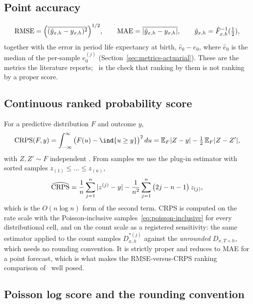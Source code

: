 \subsection{Point accuracy}

\begin{equation}
  \operatorname{RMSE} = \Big(\overline{(\hat y_{x,h}-y_{x,h})^2}\Big)^{1/2},\qquad
  \operatorname{MAE} = \overline{|\hat y_{x,h}-y_{x,h}|},\qquad
  \hat y_{x,h} = \hat F^{-1}_{x,h}(\tfrac12),
\end{equation}
together with the error in period life expectancy at birth,
$\hat e_0 - e_0$, where $\hat e_0$ is the median of the per-sample
$e^{(j)}_0$ (Section~\ref{sec:metrics-actuarial}). These are the metrics
the literature reports; \Hone\ is the check that ranking by them is not
ranking by a proper score.

\subsection{Continuous ranked probability score}

For a predictive distribution $F$ and outcome $y$,
\begin{equation}
  \CRPS(F,y) = \int_{-\infty}^{\infty}\big(F(u)-\ind\{u\ge y\}\big)^2\,du
  = \E_F|Z-y| - \tfrac12\,\E_F|Z-Z'|,
\end{equation}
with $Z,Z'\sim F$ independent \citep{gneiting2007strictly}. From samples we
use the plug-in estimator with sorted samples $z_{(1)}\le\dots\le z_{(n)}$,
\begin{equation}
  \widehat{\operatorname{CRPS}} = \frac1n\sum_{j=1}^{n}|z^{(j)}-y|
  - \frac{1}{n^2}\sum_{j=1}^{n}\big(2j-n-1\big)\,z_{(j)},
  \label{eq:crps-sample}
\end{equation}
which is the $O(n\log n)$ form of the second term. CRPS is computed on the
rate scale with the Poisson-inclusive samples~\eqref{eq:poisson-inclusive}
for every distributional cell, and on the count scale as a registered
sensitivity: the same estimator applied to the count samples
$D^{\ast(j)}_{x,h}$ against the \emph{unrounded} $D_{x,T+h}$, which needs
no rounding convention. It is strictly proper and reduces to MAE for a
point forecast, which is what makes the RMSE-versus-CRPS ranking comparison
of \Hone\ well posed.

\subsection{Poisson log score and the rounding convention}
\label{sec:metrics-logscore}


